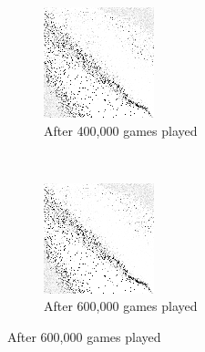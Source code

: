 \begin{figure}
	\begin{subfigure}[b]{0.4\textwidth}
	\includegraphics[width=\linewidth]{images/findings/round2/flipbook/winner/checkpoint_400000.png}
	\caption{After 400,000 games played}
	\end{subfigure}
	~
	\begin{subfigure}[b]{0.4\textwidth}
	\includegraphics[width=\linewidth]{images/findings/round2/flipbook/winner/checkpoint_600000.png}
	\caption{After 600,000 games played}
	\end{subfigure}


\end{figure}
